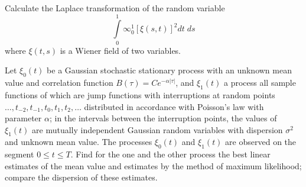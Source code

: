 \begin{problem}%
Calculate the Laplace transformation of the random variable
$$
\int\limits^1_0 \infty^1_0 \left[\xi (s,t) \right]^2 dt \; ds
$$
where $\xi(t,s)$ is a Wiener field of two variables.
\end{problem}

\begin{problem}%
Let $\xi_0 (t)$ be a Gaussian stochastic stationary process with an
unknown mean value and correlation function $B(\tau)  = C
e^{-\alpha|\tau|}$, and $\xi_1(t)$ a process all sample functions of
which are jump functions with interruptions at random points $\ldots,
t_{-2}, t_{-1}, t_0, t_1, t_2, \ldots$ distributed in accordance with
Poisson's law with parameter $\alpha$; in the intervals between the
interruption points, the values of $\xi_1(t)$ are mutually independent
Gaussian random variables with dispersion $\sigma^2$ and unknown mean
value. The processes $\xi_0 (t)$ and $\xi_1(t)$ are observed on the
segment $0 \leqslant t \leqslant T$. Find for the one and the other
process the best linear estimates of the mean value and estimates by
the method of maximum likelihood; compare the dispersion of these estimates.
\end{problem}

